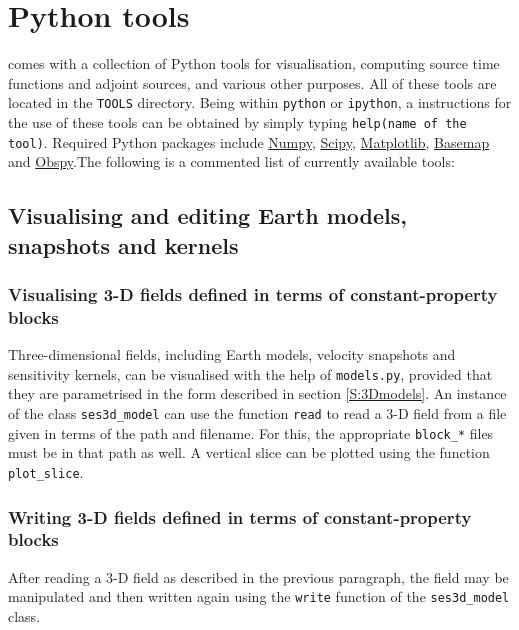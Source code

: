 \chapter{Python tools}\label{S:Python}

\SES comes with a collection of Python tools for visualisation, computing source time functions and adjoint sources, and various other purposes. All of these tools are located in the \texttt{TOOLS} directory. Being within \texttt{python} or \texttt{ipython}, a instructions for the use of these tools can be obtained by simply typing \texttt{help(name of the tool)}. Required Python packages include \href{www.numpy.org}{Numpy}, \href{www.scipy.org}{Scipy}, \href{http://matplotlib.org}{Matplotlib}, \href{http://matplotlib.org/basemap/}{Basemap} and \href{www.obspy.org}{Obspy}.The following is a commented list of currently available tools:

\section{Visualising and editing Earth models, snapshots and kernels}

\subsection{Visualising 3-D fields defined in terms of constant-property blocks}

Three-dimensional fields, including Earth models, velocity snapshots and sensitivity kernels, can be visualised with the help of \texttt{models.py}, provided that they are parametrised in the form described in section \ref{S:3Dmodels}. An instance of the class \texttt{ses3d\_model} can use the function \texttt{read} to read a 3-D field from a file given in terms of the path and filename. For this, the appropriate \texttt{block\_*} files must be in that path as well. A vertical slice can be plotted using the function \texttt{plot\_slice}. 

\subsection{Writing 3-D fields defined in terms of constant-property blocks}

After reading a 3-D field as described in the previous paragraph, the field may be manipulated and then written again using the \texttt{write} function of the \texttt{ses3d\_model} class.

